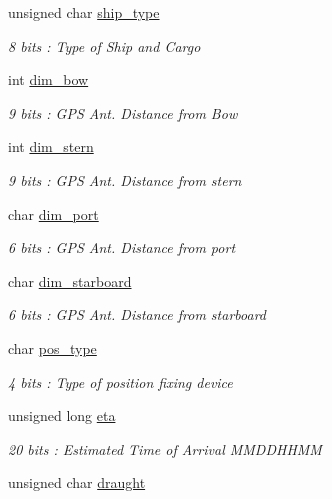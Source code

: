 \begin{DoxyCompactItemize}
unsigned char \mbox{\hyperlink{structaismsg__5_a18f68dd71d779d3153eb541f51cbd7c4}{ship\+\_\+type}}
\begin{DoxyCompactList}\small\item\em 8 bits \+: Type of Ship and Cargo \end{DoxyCompactList}\item 
int \mbox{\hyperlink{structaismsg__5_a7e5c5344921bc9ab5259802656629e50}{dim\+\_\+bow}}
\begin{DoxyCompactList}\small\item\em 9 bits \+: G\+PS Ant. Distance from Bow \end{DoxyCompactList}\item 
int \mbox{\hyperlink{structaismsg__5_a4fd6867f4825ec996d22a97205fb2f23}{dim\+\_\+stern}}
\begin{DoxyCompactList}\small\item\em 9 bits \+: G\+PS Ant. Distance from stern \end{DoxyCompactList}\item 
char \mbox{\hyperlink{structaismsg__5_af55fa8562c59bf6cfd4d94782a2f1543}{dim\+\_\+port}}
\begin{DoxyCompactList}\small\item\em 6 bits \+: G\+PS Ant. Distance from port \end{DoxyCompactList}\item 
char \mbox{\hyperlink{structaismsg__5_a2fb98e2d506694db9f47320aa63aabeb}{dim\+\_\+starboard}}
\begin{DoxyCompactList}\small\item\em 6 bits \+: G\+PS Ant. Distance from starboard \end{DoxyCompactList}\item 
char \mbox{\hyperlink{structaismsg__5_a8b13d1e367346a69166b0280f5fc95c3}{pos\+\_\+type}}
\begin{DoxyCompactList}\small\item\em 4 bits \+: Type of position fixing device \end{DoxyCompactList}\item 
unsigned long \mbox{\hyperlink{structaismsg__5_aedf0bb8fc2c7d57776258529c2d4f5be}{eta}}
\begin{DoxyCompactList}\small\item\em 20 bits \+: Estimated Time of Arrival M\+M\+D\+D\+H\+H\+MM \end{DoxyCompactList}\item 
unsigned char \mbox{\hyperlink{structaismsg__5_ac135c36dd38e20510f22d48ec09fce72}{draught}}

\end{DoxyCompactItemize}
